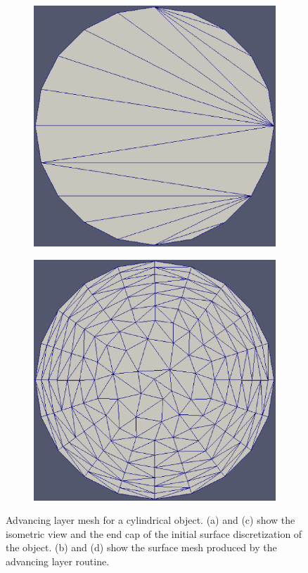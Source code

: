 \documentclass[conf]{new-aiaa}
\begin{document}
\begin{figure}[hbt!]
\begin{subfigure}{.5\textwidth}
  \caption{}
  \label{cyl-coarse-mesh}
\end{subfigure}
\begin{subfigure}{.5\textwidth}
  \centering
  \includegraphics[width=.9\linewidth]{cylinder/coarse/cyl-coarse-cap.eps}
  \caption{}
  \label{cyl-coarse-cap}
\end{subfigure}%
\begin{subfigure}{.5\textwidth}
  \centering
  \includegraphics[width=.9\linewidth]{cylinder/coarse/cylinder-coarse-cap-mesh.eps}
  \caption{}
  \label{cyl-coarse-cap-mesh}
\end{subfigure}
\caption{Advancing layer mesh for a cylindrical object. (a) and (c) show the isometric view and the end cap of the initial surface discretization of the object. (b) and (d) show the surface mesh produced by the advancing layer routine.}
\label{cylinder}
\end{figure}
\end{document}
